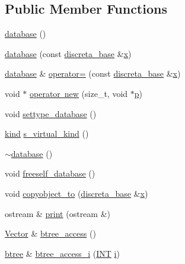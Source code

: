 \subsection*{Public Member Functions}
\begin{DoxyCompactItemize}
\item 
\mbox{\hyperlink{classdatabase_a35ec480ed529a9d092a7ebc5472b767f}{database}} ()
\item 
\mbox{\hyperlink{classdatabase_af9fba38cbd879c1a3c0388c111c774ef}{database}} (const \mbox{\hyperlink{classdiscreta__base}{discreta\+\_\+base}} \&\mbox{\hyperlink{alphabet2_8_c_a6150e0515f7202e2fb518f7206ed97dc}{x}})
\item 
\mbox{\hyperlink{classdatabase}{database}} \& \mbox{\hyperlink{classdatabase_a47f3f73586a1384925a89bcdaf14897a}{operator=}} (const \mbox{\hyperlink{classdiscreta__base}{discreta\+\_\+base}} \&\mbox{\hyperlink{alphabet2_8_c_a6150e0515f7202e2fb518f7206ed97dc}{x}})
\item 
void $\ast$ \mbox{\hyperlink{classdatabase_a26b458d54ee0723351ff1a8aeb3b3d53}{operator new}} (size\+\_\+t, void $\ast$\mbox{\hyperlink{alphabet2_8_c_a533391314665d6bf1b5575e9a9cd8552}{p}})
\item 
void \mbox{\hyperlink{classdatabase_a014639aa001462e480eb1f3984839b72}{settype\+\_\+database}} ()
\item 
\mbox{\hyperlink{discreta_8h_aaf25ee7e2306d78c74ec7bc48f092e81}{kind}} \mbox{\hyperlink{classdatabase_a30a79d9d1ae22f160368de28625ddeba}{s\+\_\+virtual\+\_\+kind}} ()
\item 
\mbox{\hyperlink{classdatabase_a31008de680565a626cd975c25d4351db}{$\sim$database}} ()
\item 
void \mbox{\hyperlink{classdatabase_a4dc263211f9b364e4fa733c8cf53e066}{freeself\+\_\+database}} ()
\item 
void \mbox{\hyperlink{classdatabase_a7402d11485a917293586dcf082f506b2}{copyobject\+\_\+to}} (\mbox{\hyperlink{classdiscreta__base}{discreta\+\_\+base}} \&\mbox{\hyperlink{alphabet2_8_c_a6150e0515f7202e2fb518f7206ed97dc}{x}})
\item 
ostream \& \mbox{\hyperlink{classdatabase_a55930857986406ef0650509001c7af76}{print}} (ostream \&)
\item 
\mbox{\hyperlink{class_vector}{Vector}} \& \mbox{\hyperlink{classdatabase_a30109ba5488b06111439f887fc1ac499}{btree\+\_\+access}} ()
\item 
\mbox{\hyperlink{classbtree}{btree}} \& \mbox{\hyperlink{classdatabase_a215047d1b32b8bd54f91a7bdca168eee}{btree\+\_\+access\+\_\+i}} (\mbox{\hyperlink{galois_8h_a09fddde158a3a20bd2dcadb609de11dc}{I\+NT}} \mbox{\hyperlink{alphabet2_8_c_acb559820d9ca11295b4500f179ef6392}{i}})

\end{DoxyCompactItemize}
